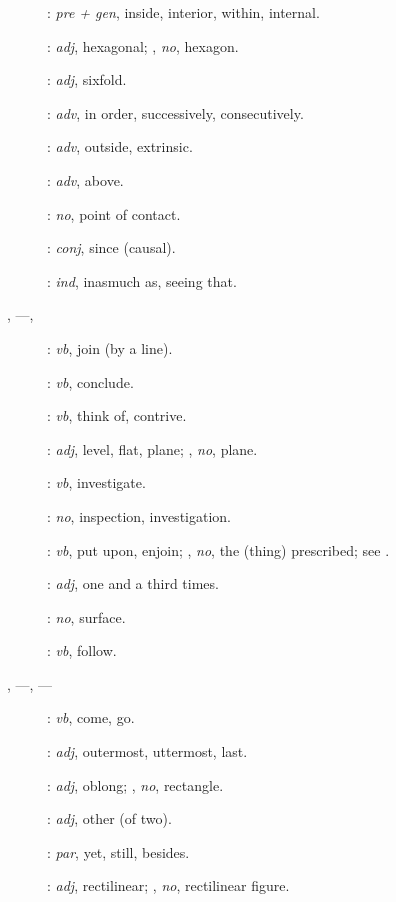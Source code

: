 {\begin{description}
\item[]: {\em pre + gen}, inside, interior, within, internal.
\item[]: {\em adj}, hexagonal; ,
{\em no}, hexagon.
\item[]: {\em adj}, sixfold.
\item[]: {\em adv}, in order, successively, consecutively.
\item[]: {\em adv}, outside, extrinsic.
\item[]: {\em adv}, above.
\item[]: {\em no}, point of contact.
\item[]: {\em conj}, since (causal).
\item[]: {\em ind}, inasmuch as, seeing that.
\item[, ---, ] : {\em vb}, join (by a line).
\item[]: {\em vb}, conclude.
\item[]: {\em vb}, think of, contrive.
\item[]: {\em adj}, level, flat, plane; , {\em no}, plane.
\item[]: {\em vb}, investigate.
\item[]: {\em no}, inspection, investigation.
\item[]: {\em vb}, put upon, enjoin; , {\em no}, the (thing) prescribed; see .
\item[]: {\em adj}, one and a third times. 
\item[]: {\em no}, surface.
\item[]: {\em vb}, follow.
\item[, ---,  ---]: {\em vb}, come, go.
\item[]: {\em  adj}, outermost, uttermost, last.
\item[]: {\em adj}, oblong; , {\em no}, rectangle.
\item[]: {\em adj},  other (of two).
\item[]: {\em par}, yet, still, besides.
\item[]: {\em adj}, rectilinear; , {\em no}, rectilinear figure.

\end{description}}
